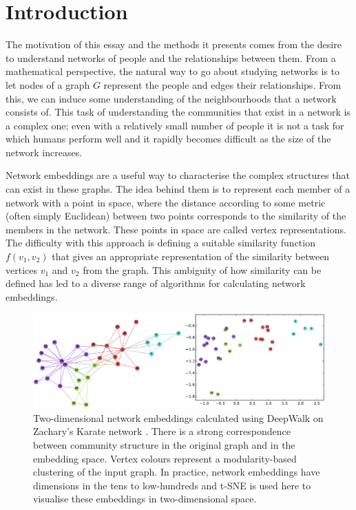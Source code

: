 \documentclass[a4paper]{article}
\begin{document}


\tableofcontents

\section{Introduction}
The motivation of this essay and the methods it presents comes from the desire to understand networks of people and the relationships between them.
From a mathematical perspective, the natural way to go about studying networks is to let nodes of a graph $G$ represent the people and edges their relationships.
From this, we can induce some understanding of the neighbourhoods that a network consists of. This task of understanding the communities that exist in a network is a complex one; 
even with a relatively small number of people it is not a task for which humans perform well and it rapidly becomes difficult as the size of the network increases.\par
Network embeddings are a useful way to characterise the complex structures that
can exist in these graphs. The idea behind them is to represent each member of a
network with a point in space, where the distance according to some metric
(often simply Euclidean) between two points corresponds to the similarity of
the members in the network. These points in space are called vertex
representations. The difficulty with this approach is defining a suitable
similarity function $f(v_1,v_2)$ that gives an appropriate representation of the similarity between vertices $v_1$ and $v_2$ from the graph. This ambiguity of how similarity can be defined has led to a diverse range of algorithms for calculating network embeddings.

\begin{figure}[h!]
  \centering
  \includegraphics[width = 1\textwidth]{src/DeepWalkOnKarateGraph.png}

  \caption{Two-dimensional network embeddings calculated using
    DeepWalk \cite{deepwalk} on Zachary's Karate network \cite{zachary1977}. There is a strong
    correspondence between community structure in the original graph and
    in the embedding space. Vertex colours represent a modularity-based
    clustering of the input graph. In practice, network embeddings have dimensions
    in the tens to low-hundreds and t-SNE \cite{maaten2008} is used here to visualise these embeddings in two-dimensional
    space.}
\end{figure}
\end{document}
